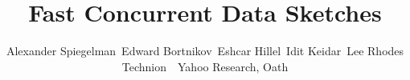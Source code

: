 \documentclass[twocolumn,10pt]{article}
\begin{document}
\title{Fast Concurrent Data Sketches} 


\author{
Alexander Spiegelman\footnotemark[1] \ 
Edward Bortnikov\footnotemark[2]  \
Eshcar Hillel\footnotemark[2] \ 
Idit Keidar\footnotemark[1]\footnotemark[2] \ 
Lee Rhodes\footnotemark[2]\\ 
\footnotemark[1] Technion\ \ \footnotemark[2] Yahoo Research, Oath
}


\date{}


\maketitle







%

            




%
\small





\end{document}

